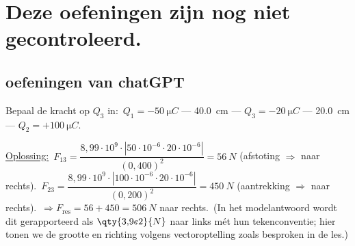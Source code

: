 \section{Deze oefeningen zijn nog niet gecontroleerd.}
\subsection{oefeningen van chatGPT}


\begin{oef}\label{oH1:Q3}
Bepaal de kracht op $Q_3$ in:\
$Q_1=-\qty{50}{\micro C}$ — \qty{40,0}{cm} — $Q_3=-\qty{20}{\micro C}$ — \qty{20,0}{cm} — $Q_2=+\qty{100}{\micro C}$.
\end{oef}
\begin{opl}\label{opl oH1:Q3}
\underline{Oplossing:}\
$F_{13}= \dfrac{8{,}99\cdot10^{9}\cdot |50\cdot10^{-6}\cdot20\cdot10^{-6}|}{(0{,}400)^2}
=\qty{56}{N}$ (afstoting $\Rightarrow$ naar rechts).\
$F_{23}= \dfrac{8{,}99\cdot10^{9}\cdot |100\cdot10^{-6}\cdot20\cdot10^{-6}|}{(0{,}200)^2}
=\qty{450}{N}$ (aantrekking $\Rightarrow$ naar rechts).\
$\Rightarrow F_{\text{res}}=56+450=\qty{506}{N}$ naar rechts.\
(In het modelantwoord wordt dit gerapporteerd als $\qty{3{,}9e2}{N}$ naar links mét hun tekenconventie; hier tonen we de grootte en richting volgens vectoroptelling zoals besproken in de les.)
\end{opl}





